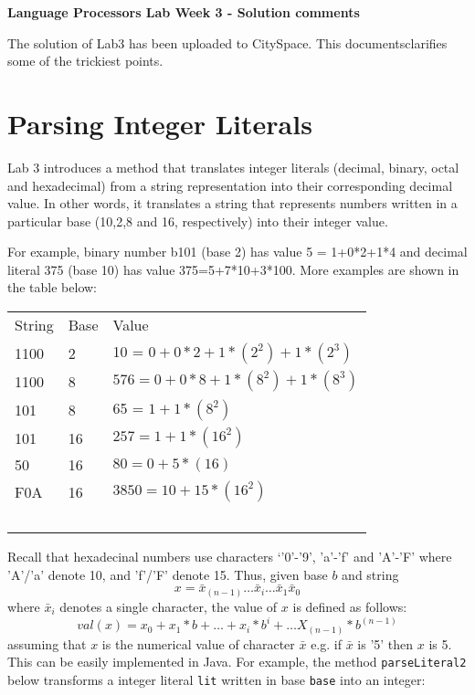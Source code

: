\documentclass{article}
\begin{document}
\thispagestyle{empty}

\newcommand{\negra}[1]{\textbf{#1}}

\large{\bf Language Processors Lab Week 3 - Solution comments}

\medskip\noindent The solution of Lab3 has been uploaded to CitySpace. This documentsclarifies some of the trickiest points.

\section{Parsing Integer Literals}

Lab 3 introduces a method that translates integer literals (decimal, binary, octal and hexadecimal) from a string representation into their corresponding decimal value.  In other words, it translates a string that represents numbers written in a particular base (10,2,8 and 16, respectively) into their integer value.

For example, binary number b101 (base 2) has value 5 = 1+0*2+1*4 and decimal literal  375 (base 10) has value 375=5+7*10+3*100.  More examples are shown in the table below:\\

\begin{tabular}[c]{lll}
\hline
String	& Base	& Value \\
1100 & 2 & 10 = $0+0*2+1*(2^2)+1*(2^3)$ \\
1100 & 8 & $576  = 0+0*8+1*(8^2)+1*(8^3)$ \\
101 & 8	& 65 = $1+1*(8^2) $ \\
101 & 16 & $257 = 1+1*(16^2)$ \\
50 & 16 & $80 = 0 + 5*(16)$ \\
F0A & 16 & $3850 = 10 + 15*(16^2)$ \\
\hline
\ \\
\end{tabular}

Recall that hexadecinal numbers use characters ‘'0'-'9', 'a'-'f' and 'A'-'F' where 'A'/'a' denote 10, and 'f'/'F' denote 15. Thus, given base $b$ and string
$$x = \bar{x}_{(n-1)}\ldots\bar{x}_i\ldots\bar{x}_1\bar{x}_0$$
where $\bar{x}_i$ denotes a single character, the value of $x$ is defined as follows:
$$
\mathit{val}(x) = x_0 + x_1*b + \dots + x_i*b^i + \dots X_{(n-1)}*b^{(n-1)}
$$
assuming that $x$ is the numerical value of character $\bar{x}$ e.g. if $\bar{x}$ is '5' then $x$ is 5. This can be easily implemented in Java. For example, the method {\tt parseLiteral2} below transforms a integer literal {\tt lit} written in base {\tt base} into an integer:
\end{document}
